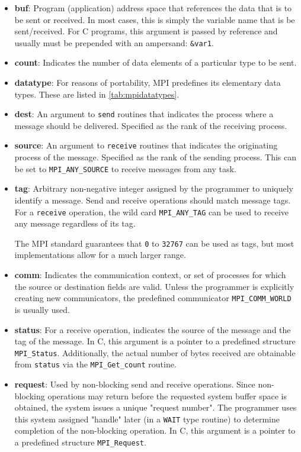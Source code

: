 \begin{itemize}
\item \textbf{buf}: Program (application) address space that references the data that is to be sent or received. In most cases, this is simply the variable name that is be sent/received. For C programs, this argument is passed by reference and usually must be prepended with an ampersand: \texttt{\&var1}.
\item \textbf{count}: Indicates the number of data elements of a particular type to be sent. 
\item \textbf{datatype}: For reasons of portability, MPI predefines its elementary data types. These are listed in \autoref{tab:mpidatatypes}.
\item \textbf{dest}: An argument to \texttt{send} routines that indicates the process where a message should be delivered. Specified as the rank of the receiving process.
\item \textbf{source}: An argument to \texttt{receive} routines that indicates the originating process of the message. Specified as the rank of the sending process. This can be set to \texttt{MPI\_ANY\_SOURCE} to receive messages from any task.
\item \textbf{tag}: Arbitrary non-negative integer assigned by the programmer to uniquely identify a message. Send and receive operations should match message tags. For a \texttt{receive} operation, the wild card \texttt{MPI\_ANY\_TAG} can be used to receive any message regardless of its tag.

The MPI standard guarantees that \texttt{0} to \texttt{32767} can be used as tags, but most implementations allow for a much larger range.
\item \textbf{comm}: Indicates the communication context, or set of processes for which the source or destination fields are valid. Unless the programmer is explicitly creating new communicators, the predefined communicator \texttt{MPI\_COMM\_WORLD} is usually used. 
\item \textbf{status}: For a receive operation, indicates the source of the message and the tag of the message. In C, this argument is a pointer to a predefined structure \texttt{MPI\_Status}. Additionally, the actual number of bytes received are obtainable from \texttt{status} via the \texttt{MPI\_Get\_count} routine. 
\item \textbf{request}: Used by non-blocking send and receive operations. Since non-blocking operations may return before the requested system buffer space is obtained, the system issues a unique "request number". The programmer uses this system assigned "handle" later (in a \texttt{WAIT} type routine) to determine completion of the non-blocking operation. In C, this argument is a pointer to a predefined structure \texttt{MPI\_Request}. 
\end{itemize}

